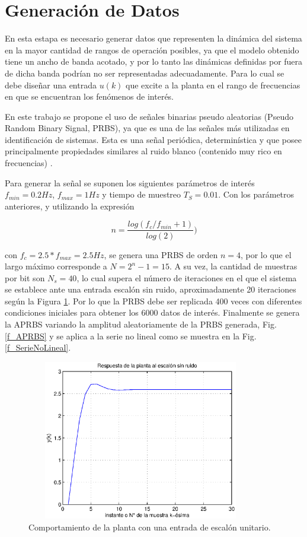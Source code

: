 \documentclass[12pt]{article}
\begin{document}
\newpage
\section{Generación de Datos}

En esta estapa es necesario generar datos que representen la dinámica del sistema en la mayor cantidad de rangos de operación posibles, ya que el modelo obtenido tiene un ancho de banda acotado, y por lo tanto las dinámicas definidas por fuera de dicha banda podrían no ser representadas adecuadamente. Para lo cual se debe diseñar una entrada $u(k)$ que excite a la planta en el rango de frecuencias en que se encuentran los fenómenos de interés.

En este trabajo se propone el uso de señales binarias pseudo aleatorias (Pseudo Random Binary Signal, PRBS),  ya  que  es  una  de  las  señales  más  utilizadas  en  identificación  de sistemas. Esta es una señal periódica, determinística y que  posee  principalmente  propiedades  similares  al  ruido  blanco  (contenido  muy  rico  en frecuencias) \citep{nelles2013nonlinear}.

Para generar la señal se suponen los siguientes parámetros de interés $f_{min}=0.2 Hz$, $f_{max}=1 Hz$ y tiempo de muestreo $T_S=0.01$. Con los parámetros anteriores, y utilizando la expresión

\begin{equation}
n=\frac{log(f_c/f_{min}+1)}{log(2)})
\label{e_}
\end{equation}

con $f_c=2.5*f_{max}=2.5 Hz$, se genera una PRBS de orden $n= 4$, por lo que el largo máximo corresponde a $N = 2^n - 1 = 15$. A su vez, la cantidad de muestras por bit son $N_{s} = 40$,  lo cual supera el número de iteraciones en el que el sistema se establece ante una entrada escalón sin ruido, aproximadamente 20 iteraciones según la Figura \ref{eval_model}. Por lo que la PRBS debe ser replicada 400 veces con diferentes condiciones iniciales para obtener los 6000 datos de interés. Finalmente se genera la APRBS variando la amplitud aleatoriamente de la PRBS generada, Fig.\ref{f_APRBS} y se aplica a la serie no lineal como se muestra en la Fig.\ref{f_SerieNoLineal}.


\begin{figure}
	\centering
	 \includegraphics[width=10cm,height=7cm]{imag/evol_model.eps}
	\caption{Comportamiento de la planta con una entrada de escalón unitario.}
	\label{eval_model}
\end{figure}
\end{document}
